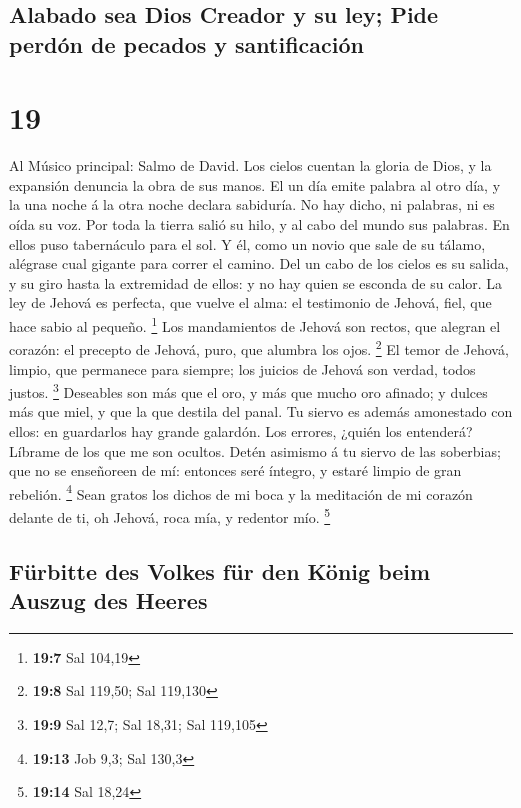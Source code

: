 \hypertarget{alabado-sea-dios-creador-y-su-ley-pide-perduxf3n-de-pecados-y-santificaciuxf3n}{%
\subsection{Alabado sea Dios Creador y su ley; Pide perdón de pecados y
santificación}\label{alabado-sea-dios-creador-y-su-ley-pide-perduxf3n-de-pecados-y-santificaciuxf3n}}

\hypertarget{section-18}{%
\section{19}\label{section-18}}

 Al Músico principal: Salmo de David. Los cielos cuentan la
gloria de Dios, y la expansión denuncia la obra de sus manos.
 El un día emite palabra al otro día, y la una noche á la
otra noche declara sabiduría.  No hay dicho, ni palabras, ni
es oída su voz.  Por toda la tierra salió su hilo, y al cabo
del mundo sus palabras. En ellos puso tabernáculo para el sol.
 Y él, como un novio que sale de su tálamo, alégrase cual
gigante para correr el camino.  Del un cabo de los cielos es
su salida, y su giro hasta la extremidad de ellos: y no hay quien se
esconda de su calor.  La ley de Jehová es perfecta, que
vuelve el alma: el testimonio de Jehová, fiel, que hace sabio al
pequeño. \footnote{\textbf{19:7} Sal 104,19}  Los
mandamientos de Jehová son rectos, que alegran el corazón: el precepto
de Jehová, puro, que alumbra los ojos. \footnote{\textbf{19:8} Sal
  119,50; Sal 119,130}  El temor de Jehová, limpio, que
permanece para siempre; los juicios de Jehová son verdad, todos justos.
\footnote{\textbf{19:9} Sal 12,7; Sal 18,31; Sal 119,105} 
Deseables son más que el oro, y más que mucho oro afinado; y dulces más
que miel, y que la que destila del panal.  Tu siervo es
además amonestado con ellos: en guardarlos hay grande galardón.
 Los errores, ¿quién los entenderá? Líbrame de los que me
son ocultos.  Detén asimismo á tu siervo de las soberbias;
que no se enseñoreen de mí: entonces seré íntegro, y estaré limpio de
gran rebelión. \footnote{\textbf{19:13} Job 9,3; Sal 130,3}
 Sean gratos los dichos de mi boca y la meditación de mi
corazón delante de ti, oh Jehová, roca mía, y redentor mío. \footnote{\textbf{19:14}
  Sal 18,24}

\hypertarget{fuxfcrbitte-des-volkes-fuxfcr-den-kuxf6nig-beim-auszug-des-heeres}{%
\subsection{Fürbitte des Volkes für den König beim Auszug des
Heeres}\label{fuxfcrbitte-des-volkes-fuxfcr-den-kuxf6nig-beim-auszug-des-heeres}}

